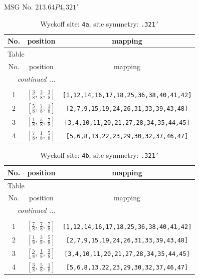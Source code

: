\documentclass[fleqn,8pt]{jsarticle}
\begin{document}
\setcounter{MaxMatrixCols}{32}

\renewcommand{\tablename}{Table~}
\renewcommand{\figurename}{Figure~}
\begin{center}
\LARGE
MSG No. 213.64\quad$P4_{1}321'$
\end{center}
\renewcommand{\arraystretch}{1.2}
\begin{longtable}{ccc}
\caption{Wyckoff site: {\tt 4a}, site symmetry: {\tt .321'}}
 \\
 \hline \hline
No. & position & mapping \\ \hline \endfirsthead

\multicolumn{2}{l}{\tablename\ \thetable{}} \\
 \hline \hline
No. & position & mapping \\ \hline \endhead

 \hline \hline
\multicolumn{2}{r}{\footnotesize\it continued ...} \\ \endfoot

 \hline \hline
\multicolumn{2}{r}{} \\ \endlastfoot

1 & $\left[ \frac{3}{8},\, \frac{3}{8},\, \frac{3}{8} \right]$ & {\tt [1,12,14,16,17,18,25,36,38,40,41,42]} \\ \hline
2 & $\left[ \frac{5}{8},\, \frac{7}{8},\, \frac{1}{8} \right]$ & {\tt [2,7,9,15,19,24,26,31,33,39,43,48]} \\ \hline
3 & $\left[ \frac{1}{8},\, \frac{5}{8},\, \frac{7}{8} \right]$ & {\tt [3,4,10,11,20,21,27,28,34,35,44,45]} \\ \hline
4 & $\left[ \frac{7}{8},\, \frac{1}{8},\, \frac{5}{8} \right]$ & {\tt [5,6,8,13,22,23,29,30,32,37,46,47]} \\
\end{longtable}
\renewcommand{\arraystretch}{1.2}
\begin{longtable}{ccc}
\caption{Wyckoff site: {\tt 4b}, site symmetry: {\tt .321'}}
 \\
 \hline \hline
No. & position & mapping \\ \hline \endfirsthead

\multicolumn{2}{l}{\tablename\ \thetable{}} \\
 \hline \hline
No. & position & mapping \\ \hline \endhead

 \hline \hline
\multicolumn{2}{r}{\footnotesize\it continued ...} \\ \endfoot

 \hline \hline
\multicolumn{2}{r}{} \\ \endlastfoot

1 & $\left[ \frac{7}{8},\, \frac{7}{8},\, \frac{7}{8} \right]$ & {\tt [1,12,14,16,17,18,25,36,38,40,41,42]} \\ \hline
2 & $\left[ \frac{1}{8},\, \frac{3}{8},\, \frac{5}{8} \right]$ & {\tt [2,7,9,15,19,24,26,31,33,39,43,48]} \\ \hline
3 & $\left[ \frac{5}{8},\, \frac{1}{8},\, \frac{3}{8} \right]$ & {\tt [3,4,10,11,20,21,27,28,34,35,44,45]} \\ \hline
4 & $\left[ \frac{3}{8},\, \frac{5}{8},\, \frac{1}{8} \right]$ & {\tt [5,6,8,13,22,23,29,30,32,37,46,47]} \\
\end{longtable}
\end{document}
